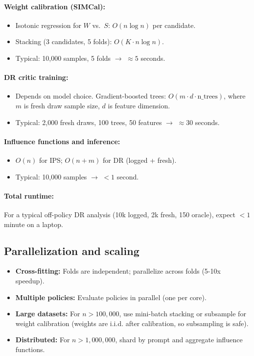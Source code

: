 \paragraph{Weight calibration (SIMCal):}
\begin{itemize}
\item Isotonic regression for $W$ vs.\ $S$: $O(n \log n)$ per candidate.
\item Stacking (3 candidates, 5 folds): $O(K \cdot n \log n)$.
\item Typical: 10,000 samples, 5 folds $\to$ $\approx 5$ seconds.
\end{itemize}

\paragraph{DR critic training:}
\begin{itemize}
\item Depends on model choice. Gradient-boosted trees: $O(m \cdot d \cdot \text{n\_trees})$, where $m$ is fresh draw sample size, $d$ is feature dimension.
\item Typical: 2,000 fresh draws, 100 trees, 50 features $\to$ $\approx 30$ seconds.
\end{itemize}

\paragraph{Influence functions and inference:}
\begin{itemize}
\item $O(n)$ for IPS; $O(n + m)$ for DR (logged + fresh).
\item Typical: 10,000 samples $\to$ $< 1$ second.
\end{itemize}

\paragraph{Total runtime:} For a typical off-policy DR analysis (10k logged, 2k fresh, 150 oracle), expect $< 1$ minute on a laptop.

\subsection{Parallelization and scaling}

\begin{itemize}
\item \textbf{Cross-fitting:} Folds are independent; parallelize across folds (5-10x speedup).
\item \textbf{Multiple policies:} Evaluate policies in parallel (one per core).
\item \textbf{Large datasets:} For $n > 100{,}000$, use mini-batch stacking or subsample for weight calibration (weights are i.i.d. after calibration, so subsampling is safe).
\item \textbf{Distributed:} For $n > 1{,}000{,}000$, shard by prompt and aggregate influence functions.
\end{itemize}

